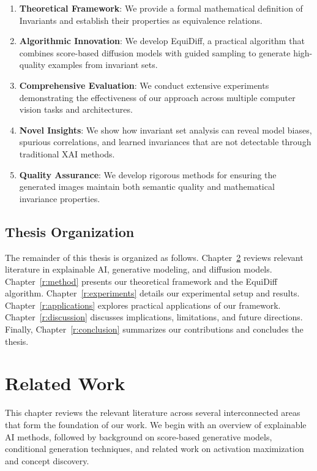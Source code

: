 \documentclass[licencjacka,en]{pracamgr}
\newcommand{\method}[1]{EquiDiff}  %
\newcommand{\invariantimages}[1]{Invariants}  %
\begin{document}
\begin{enumerate}
\item \textbf{Theoretical Framework}: We provide a formal mathematical definition of \invariantimages{} and establish their properties as equivalence relations.

\item \textbf{Algorithmic Innovation}: We develop \method{}, a practical algorithm that combines score-based diffusion models with guided sampling to generate high-quality examples from invariant sets.

\item \textbf{Comprehensive Evaluation}: We conduct extensive experiments demonstrating the effectiveness of our approach across multiple computer vision tasks and architectures.

\item \textbf{Novel Insights}: We show how invariant set analysis can reveal model biases, spurious correlations, and learned invariances that are not detectable through traditional XAI methods.

\item \textbf{Quality Assurance}: We develop rigorous methods for ensuring the generated images maintain both semantic quality and mathematical invariance properties.
\end{enumerate}

\section{Thesis Organization}

The remainder of this thesis is organized as follows. Chapter~\ref{r:related_work} reviews relevant literature in explainable AI, generative modeling, and diffusion models. Chapter~\ref{r:method} presents our theoretical framework and the \method{} algorithm. Chapter~\ref{r:experiments} details our experimental setup and results. Chapter~\ref{r:applications} explores practical applications of our framework. Chapter~\ref{r:discussion} discusses implications, limitations, and future directions. Finally, Chapter~\ref{r:conclusion} summarizes our contributions and concludes the thesis.

\chapter{Related Work}\label{r:related_work}

This chapter reviews the relevant literature across several interconnected areas that form the foundation of our work. We begin with an overview of explainable AI methods, followed by background on score-based generative models, conditional generation techniques, and related work on activation maximization and concept discovery.
\end{document}
